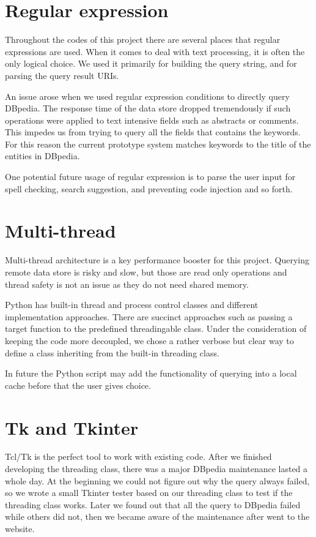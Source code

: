 \documentclass[12pt]{cls}
\begin{document}
\section{Regular expression}

Throughout the codes of this project there are several places that regular expressions are used. When it comes to deal with text processing, it is often the only logical choice. We used it primarily for building the query string, and for parsing the query result URIs.

An issue arose when we used regular expression conditions to directly query DBpedia. The response time of the data store dropped tremendously if such operations were applied to text intensive fields such as abstracts or comments. This impedes us from trying to query all the fields that contains the keywords. For this reason the current prototype system matches keywords to the title of the entities in DBpedia.

One potential future usage of regular expression is to parse the user input for spell checking, search suggestion, and preventing code injection and so forth.

\section{Multi-thread}

Multi-thread architecture is a key performance booster for this project. Querying remote data store is risky and slow, but those are read only operations and thread safety is not an issue as they do not need shared memory.

Python has built-in thread and process control classes and different implementation approaches. There are succinct approaches such as passing a target function to the predefined threadingable class. Under the consideration of keeping the code more decoupled, we chose a rather verbose but clear way to define a class inheriting from the built-in threading class.

In future the Python script may add the functionality of querying into a local cache before that the user gives choice.

\section{Tk and Tkinter}

Tcl/Tk is the perfect tool to work with existing code. After we finished developing the threading class, there was a major DBpedia maintenance lasted a whole day. At the beginning we could not figure out why the query always failed, so we wrote a small Tkinter tester based on our threading class to test if the threading class works. Later we found out that all the query to DBpedia failed while others did not, then we became aware of the maintenance after went to the website.
\end{document}
